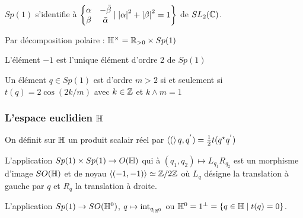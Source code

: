 \documentclass{cours}
\begin{document}
\begin{remark}
    $Sp(1)$ s'identifie à $\left\{\begin{matrix}\alpha & -\bar{\beta} \\ \beta & \bar{\alpha}\end{matrix}\mid \left|\alpha\right|^{2} + \left|\beta\right|^{2} = 1\right\}$ de $SL_{2}(\mathbb{C})$.
\end{remark}

\begin{proposition}
    Par décomposition polaire : $\mathbb{H}^{\times} = \mathbb{R}_{> 0} \times Sp(1)$
\end{proposition}

\begin{proposition}
    L'élément $-1$ est l'unique élément d'ordre $2$ de $Sp(1)$
\end{proposition}

\begin{proposition}
    Un élément $q \in Sp(1)$ est d'ordre $m > 2$ si et seulement si $t(q) = 2 \cos(2k / m)$ avec $k \in \mathbb{Z}$ et $k \wedge m = 1$
\end{proposition}

\subsubsection{L'espace euclidien $\mathbb{H}$}
\begin{definition}
    On définit sur $\mathbb{H}$ un produit scalair réel par $\left\langle ( \right\rangle q, q^{'}) = \frac{1}{2}t(q^{\star}q^{'})$
\end{definition}

\begin{proposition}
    L'application $Sp(1) \times Sp(1) \to O(\mathbb{H})$ qui à $\left(q_{1}, q_{2}\right) \mapsto L_{q_{1}}R_{q_{2}}$ est un morphisme d'image $SO(\mathbb{H})$ et de noyau $\left\langle (-1, -1) \right\rangle \simeq \mathbb{Z}/2\mathbb{Z}$ où $L_{q}$ désigne la translation à gauche par $q$ et $R_{q}$ la translation à droite. 
\end{proposition}

\begin{proposition}
    L'application $Sp(1) \rightarrow SO(\mathbb{H}^{0})$, $q\mapsto \text{int}_{q_{\mid\mathbb{H}^{0}}}$ ou $\mathbb{H}^{0} = 1^{\perp} = \left\{q \in \mathbb{H} \mid t(q) = 0\right\}$.
\end{proposition}
\end{document}
